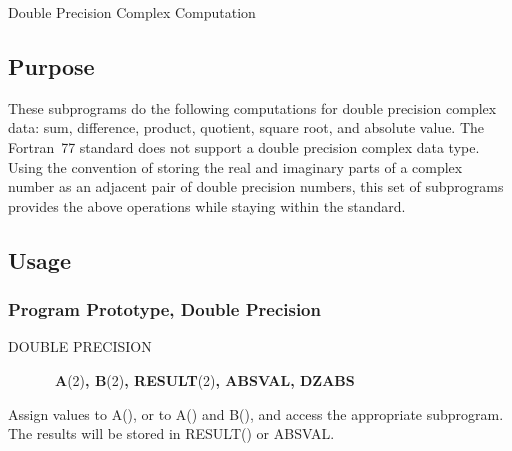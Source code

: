 \documentclass[twoside]{MATH77}
\begin{document}
  Double Precision Complex Computation


\subsection{Purpose}

These subprograms do the following computations for double precision complex
data: sum, difference, product, quotient, square root, and absolute value.
The Fortran~77 standard does not support a double precision complex data
type. Using the convention of storing the real and imaginary parts of a
complex number as an adjacent pair of double precision numbers, this set of
subprograms provides the above operations while staying within the standard.

\subsection{Usage}

\subsubsection{Program Prototype, Double Precision}

\begin{description}

\item[DOUBLE PRECISION] \ {\bf  A}(2){\bf , B}(2){\bf , RESULT}(2){\bf ,
ABSVAL, DZABS}

\end{description}

Assign values to A(), or to A() and B(), and access the appropriate
subprogram. The results will be stored in RESULT() or ABSVAL.
\begin{center}
\end{center}
\end{document}
